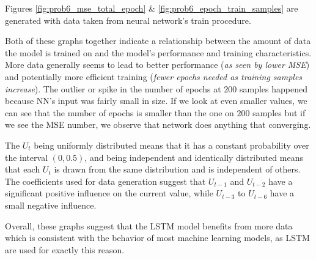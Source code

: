 Figures \ref{fig:prob6_mse_total_epoch} \& \ref{fig:prob6_epoch_train_samples} are generated with data taken from neural network's train procedure.

Both of these graphs together indicate a relationship between the amount of data the model is trained on and the model's performance and training characteristics. More data generally seems to lead to better performance (\textit{as seen by lower MSE}) and potentially more efficient training (\textit{fewer epochs needed as training samples increase}). The outlier or spike in the number of epochs at $200$ samples happened because NN's input was fairly small in size. 
If we look at even smaller values, we can see that the number of epochs is smaller than the one on $200$ samples but if we see the MSE number, we observe that network does anything that converging.

The $U_t$ being uniformly distributed means that it has a constant probability over the interval $(0, 0.5)$, and being independent and identically distributed means that each $U_t$ is drawn from the same distribution and is independent of others. The coefficients used for data generation suggest that $U_{t-1}$ and $U_{t-2}$ have a significant positive influence on the current value, while $U_{t-3}$ to $U_{t-6}$ have a small negative influence.

Overall, these graphs suggest that the LSTM model benefits from more data which is consistent with the behavior of most machine learning models, as LSTM are used for exactly this reason. 
